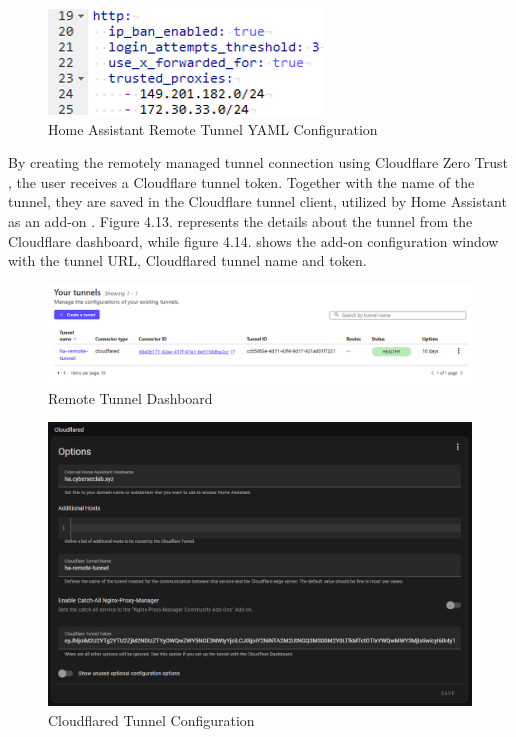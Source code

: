 \begin{figure}[H]
	\centering
	\includegraphics[width=0.5 \linewidth]{Images/K4/Picture15.png}
	\caption{Home Assistant Remote Tunnel YAML Configuration}
	\label{fig:tunnel_config}
\end{figure}

By creating the remotely managed tunnel connection using Cloudflare Zero Trust \cite{cloudflare_zt_tunnel}, the user receives a Cloudflare tunnel token. Together with the name of the tunnel, they are saved in the Cloudflare tunnel client, utilized by Home Assistant as an add-on \cite{ha_cloudflared}. Figure 4.13. represents the details about the tunnel from the Cloudflare dashboard, while figure 4.14. shows the add-on configuration window with the tunnel URL, Cloudflared tunnel name and token.
\begin{figure}[H]
	\centering
	\includegraphics[width=1 \linewidth]{Images/K4/ha-tunnel-k4.png}
	\caption{Remote Tunnel Dashboard}
	\label{fig:tunnel_dash}
\end{figure}
\begin{figure}[H]
	\centering
	\includegraphics[width=0.8 \linewidth]{Images/K4/cloudflared-config.png}
	\caption{Cloudflared Tunnel Configuration}
	\label{fig:ha_cloudflared}
\end{figure}

